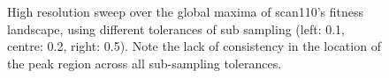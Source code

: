 \documentclass[authoryearcitations]{UoYCSproject}
\begin{document}
\begin{figure}
\begin{subfigure}[b]{0.3\textwidth}
\end{subfigure}
\begin{subfigure}[b]{0.3\textwidth}
\end{subfigure}
\begin{subfigure}[b]{0.3\textwidth}
\end{subfigure}
	\caption[Fitness landscape peaks.]{High resolution sweep over the global maxima of scan110's fitness landscape, using different tolerances of sub sampling (left: 0.1, centre: 0.2, right: 0.5). Note the lack of consistency in the location of the peak region across all sub-sampling tolerances.}
	\label{fig:landscape_peaks}
\end{figure}
\end{document}

